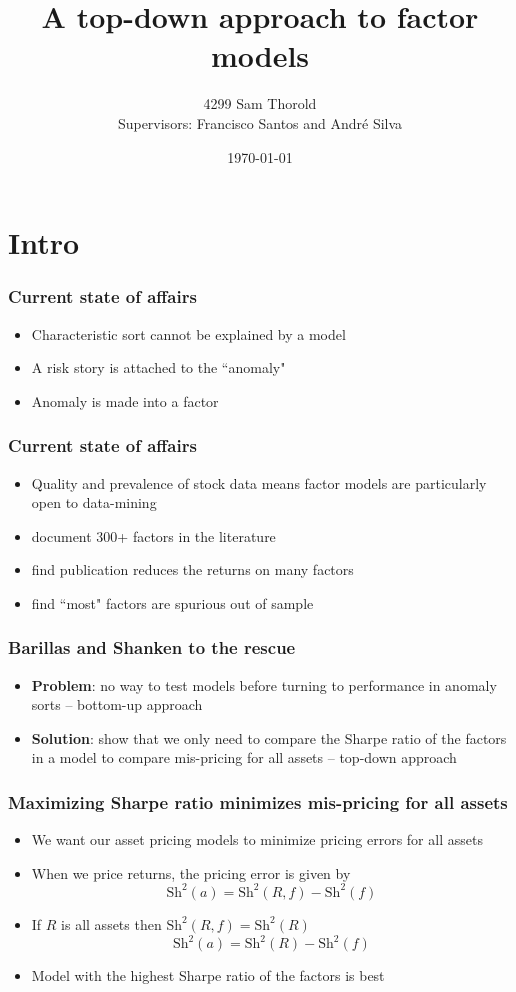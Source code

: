 \documentclass{beamer}
\title[Asset-Pricing]{A top-down approach to factor models}
\author[Thorold]{4299 Sam Thorold\\
                 Supervisors: Francisco Santos and Andr\'e Silva}
\institute{NHH and NOVA}
\date[June 2018]{\today}
\begin{document}
\frame{\titlepage}

\section{Intro}

\begin{frame}
  \frametitle{Current state of affairs}
  \begin{itemize}
    \item Characteristic sort cannot be explained by a model
    \item A risk story is attached to the ``anomaly"
    \item Anomaly is made into a factor
  \end{itemize}
\end{frame}

\begin{frame}
  \frametitle{Current state of affairs}
  \begin{itemize}
    \item Quality and prevalence of stock data means factor models are
    particularly open to data-mining
    \item \textcite{harvey2016and} document 300+ factors in the literature
    \item \textcite{mclean2016does} find publication reduces the returns on
    many factors
    \item \textcite{linnainmaa2016history} find ``most" factors are spurious
    out of sample
  \end{itemize}
\end{frame}

\begin{frame}
  \frametitle{Barillas and Shanken to the rescue}
  \begin{itemize}
    \item \textbf{Problem}:
    no way to test models before turning to performance in anomaly sorts
    -- bottom-up approach
    \item \textbf{Solution}:
    \textcite{barillas2016alpha} show that we only need to compare the Sharpe
    ratio of the factors in a model to compare mis-pricing for all assets
    -- top-down approach
  \end{itemize}
\end{frame}

\begin{frame}
\frametitle{Maximizing Sharpe ratio minimizes mis-pricing for all assets}
\begin{itemize}
    \item We want our asset pricing models to minimize pricing errors for
    all assets
    \item When we price returns, the pricing error is given by
    \[
    \text{Sh}^2(a) = \text{Sh}^2(R, f) - \text{Sh}^2(f)
    \]
    \item If $R$ is all assets then $\text{Sh}^2(R, f) = \text{Sh}^2(R)$
    \[
    \text{Sh}^2(a) = \text{Sh}^2(R) - \text{Sh}^2(f)
    \]
    \item Model with the highest Sharpe ratio of the factors is best
\end{itemize}
\end{frame}
\end{document}

